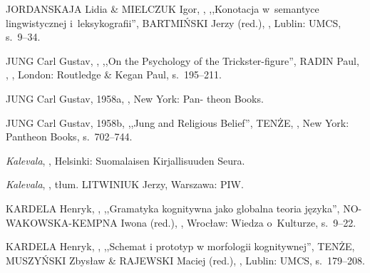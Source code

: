 \documentclass[11pt,a4paper,twoside]{report}
\begin{document}
\begin{thebibliography}{}
{JORDANSKAJA Lidia \& MIELCZUK Igor},
,
\newblock ,,Konotacja w~semantyce lingwistycznej i~leksykografii'',
\newblock {[w:]} {BARTMIŃSKI Jerzy (red.)},
,
\newblock Lublin: UMCS,
\newblock s.~9--34.

{JUNG Carl Gustav},
,
\newblock ,,On the Psychology of the Trickster-figure'',
\newblock {[w:]} {RADIN Paul},
,
,
\newblock London: Routledge \linebreak \& Kegan Paul,
\newblock s.~195--211.

{JUNG Carl Gustav},
\newblock 1958a,
,
\newblock New York: Pan- theon Books.

{JUNG Carl Gustav},
\newblock 1958b,
\newblock ,,Jung and Religious Belief'',
\newblock {[w:]} {TENŻE},
,
\newblock New York: Pantheon Books,
\newblock s.~702--744.

{\emph{Kalevala}},
,
\newblock Helsinki: Suomalaisen Kirjallisuuden Seura.

{\emph{Kalevala}},
,
\newblock tłum. {LITWINIUK Jerzy},
\newblock Warszawa: PIW.


{KARDELA Henryk},
,
\newblock ,,Gramatyka kognitywna jako globalna teoria języka'', 
\newblock {[w:]} {NO- \linebreak WAKOWSKA-KEMPNA Iwona (red.)},
,
\newblock Wrocław: Wiedza o~Kulturze,
\newblock s.~9--22.

{KARDELA Henryk},
,
\newblock ,,Schemat i prototyp w morfologii kognitywnej'',
\newblock {[w:]} {TENŻE, MUSZYŃSKI Zbysław \& RAJEWSKI Maciej (red.)},
,
\newblock Lublin: UMCS,
\newblock s.~179--208.


\end{thebibliography}
\end{document}
